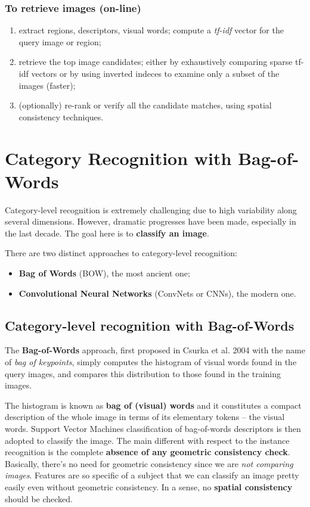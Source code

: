 \documentclass[10pt]{report}
\begin{document}
\subsubsection{To retrieve images (on\--line)}
\label{sec:org38fdd57}
\begin{enumerate}
\item extract regions, descriptors, visual words; compute a \emph{tf\--idf} vector for the query image or region;
\item retrieve the top image candidates; either by exhaustively comparing sparse tf\--idf vectors or by using inverted indeces to examine only a subset of the images (faster);
\item (optionally) re\--rank or verify all the candidate matches, using spatial consistency techniques.
\end{enumerate}

\section{Category Recognition with Bag-of-Words}
\label{sec:org745563c}
Category-level recognition is extremely challenging due to high variability along several dimensions. However, dramatic progresses have been made, especially in the last decade. The goal here is to \textbf{classify an image}.

There are two distinct approaches to category\--level recognition:
\begin{itemize}
\item \textbf{Bag of Words} (BOW), the most ancient one;
\item \textbf{Convolutional Neural Networks} (ConvNets or CNNs), the modern one.
\end{itemize}
\subsection{Category\--level recognition with Bag\--of\--Words}
\label{sec:org4d65f9b}
The \textbf{Bag\--of\--Words} approach, first proposed in Csurka et al. 2004 with the name of \emph{bag of keypoints}, simply computes the histogram of visual words found in the query images, and compares this distribution to those found in the training images.

The histogram is known as \textbf{bag of (visual) words} and it constitutes a compact description of the whole image in terms of its elementary tokens -- the visual words. Support Vector Machines classification of bag\--of\--words descriptors is then adopted to classify the image. The main different with respect to the instance recognition is the complete \textbf{absence of any geometric consistency check}. Basically, there's no need for geometric consistency since we are \emph{not comparing images}. Features are so specific of a subject that we can classify an image pretty easily even without geometric consistency. In a sense, no \textbf{spatial consistency} should be checked.
\end{document}

